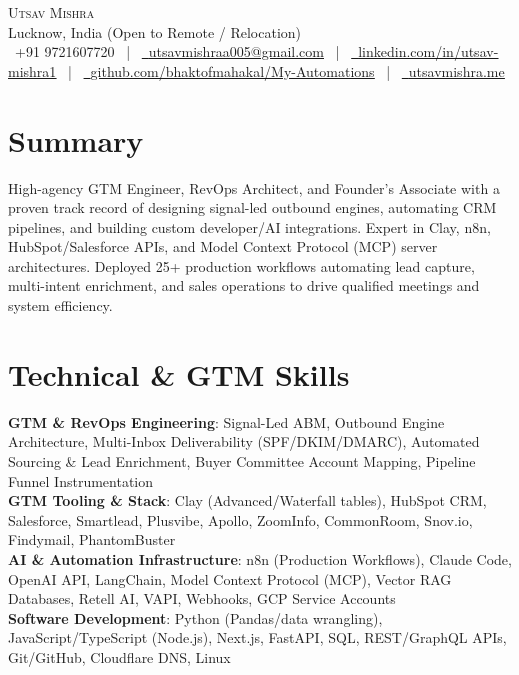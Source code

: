 \documentclass[letterpaper,11pt]{article}
\begin{document}
\begin{center}
    {\Huge \scshape Utsav Mishra} \\ \vspace{2pt}
    \small Lucknow, India (Open to Remote / Relocation) \\ \vspace{2pt}
    \small \raisebox{-0.1\height}\faPhone\ +91 9721607720 ~|~ 
    \href{mailto:utsavmishraa005@gmail.com}{\raisebox{-0.2\height}\faEnvelope\ \underline{utsavmishraa005@gmail.com}} ~|~ 
    \href{https://www.linkedin.com/in/utsav-mishra1/}{\raisebox{-0.2\height}\faLinkedin\ \underline{linkedin.com/in/utsav-mishra1}} ~|~ 
    \href{https://github.com/bhaktofmahakal/My-Automations}{\raisebox{-0.2\height}\faGithub\ \underline{github.com/bhaktofmahakal/My-Automations}} ~|~ 
    \href{https://www.utsavmishra.me/}{\raisebox{-0.2\height}\faGlobe\ \underline{utsavmishra.me}}
    \vspace{-8pt}
\end{center}

\section{Summary}
\small{High-agency GTM Engineer, RevOps Architect, and Founder's Associate with a proven track record of designing signal-led outbound engines, automating CRM pipelines, and building custom developer/AI integrations. Expert in Clay, n8n, HubSpot/Salesforce APIs, and Model Context Protocol (MCP) server architectures. Deployed 25+ production workflows automating lead capture, multi-intent enrichment, and sales operations to drive qualified meetings and system efficiency.}

\section{Technical \& GTM Skills}
 \begin{itemize}[leftmargin=0.15in, label={}]
    \small{\item{
     \textbf{GTM \& RevOps Engineering}{: Signal-Led ABM, Outbound Engine Architecture, Multi-Inbox Deliverability (SPF/DKIM/DMARC), Automated Sourcing \& Lead Enrichment, Buyer Committee Account Mapping, Pipeline Funnel Instrumentation} \\
     \textbf{GTM Tooling \& Stack}{: Clay (Advanced/Waterfall tables), HubSpot CRM, Salesforce, Smartlead, Plusvibe, Apollo, ZoomInfo, CommonRoom, Snov.io, Findymail, PhantomBuster} \\
     \textbf{AI \& Automation Infrastructure}{: n8n (Production Workflows), Claude Code, OpenAI API, LangChain, Model Context Protocol (MCP), Vector RAG Databases, Retell AI, VAPI, Webhooks, GCP Service Accounts} \\
     \textbf{Software Development}{: Python (Pandas/data wrangling), JavaScript/TypeScript (Node.js), Next.js, FastAPI, SQL, REST/GraphQL APIs, Git/GitHub, Cloudflare DNS, Linux}
    }}
 \end{itemize}
 \vspace{-16pt}
\end{document}
